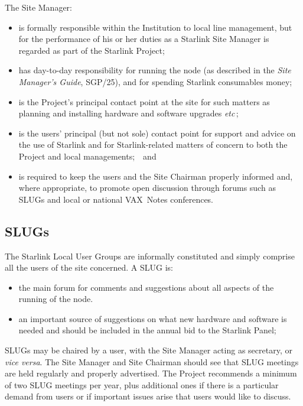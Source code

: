 \documentclass[twoside,11pt]{article}
\newcommand{\xref}[3]{#1}
\begin{document}
The Site Manager:
\begin{itemize}
\item is formally responsible within the Institution to local line
      management, but for the performance of his or her
      duties as a Starlink Site Manager
      is regarded as part of the Starlink Project;
\item has day-to-day responsibility for
      running the node (as described in the {\it Site Manager's Guide},
      \xref{SGP/25}{sgp25}{}), and for spending Starlink consumables money;
\item is the Project's principal contact point at the site for such
      matters as planning and installing hardware and
      software upgrades {\it etc}\,;
\item is the users' principal (but not sole) contact point for support and
      advice on the use of Starlink
      and for Starlink-related matters of concern to both the
      Project and local managements;~~and
\item is required to keep the users and the Site Chairman
      properly informed and, where appropriate, to promote open
      discussion through forums such as SLUGs and local or national VAX~Notes
      conferences.
\end{itemize}

\subsection{SLUGs}

The Starlink Local User Groups are informally constituted and
simply comprise all the users of the site concerned.  A SLUG is:
\begin{itemize}
\item the main forum for comments and suggestions 
      about all aspects of the running of the node.
\item an important source of suggestions on what
      new hardware and software is needed and should be included
      in the annual bid to the Starlink Panel;
\end{itemize}
SLUGs may be chaired by a user, with the Site Manager acting
as secretary, or {\it vice versa}.  The Site Manager and
Site Chairman should see that SLUG meetings are held regularly
and properly advertised.  The Project recommends a minimum of two
SLUG meetings per year, plus
additional ones if there is a particular demand from users or if
important issues arise that users would like to discuss.
\end{document}
